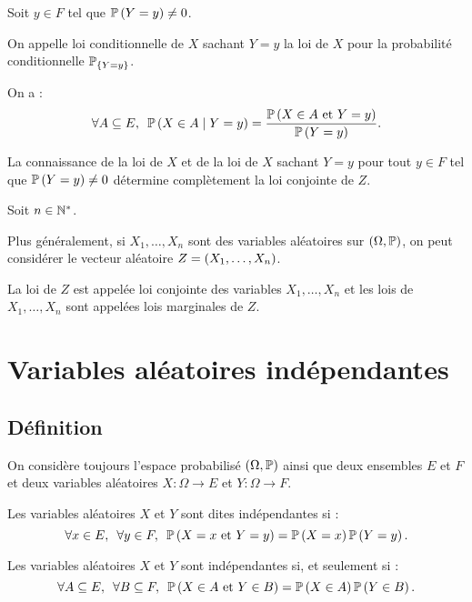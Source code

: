 \begin{defi}
Soit \(y\in F\) tel que \(\mathbb{P}\left(Y=y\right)\not=0\).

On appelle loi conditionnelle de \(X\) sachant \(Y=y\) la loi de \(X\) pour la probabilité conditionnelle \(\mathbb{P}_{\left\lbrace Y=y\right\rbrace}\).

On a : \[\quantifs{\forall A\subset E}\proba{X\in A\mid Y=y}=\dfrac{\proba{X\in A\text{ et }Y=y}}{\proba{Y=y}}.\]
\end{defi}

\begin{rem}
La connaissance de la loi de \(X\) et de la loi de \(X\) sachant \(Y=y\) pour tout \(y\in F\) tel que \(\mathbb{P}\left(Y=y\right)\not=0\) détermine complètement la loi conjointe de \(Z\).
\end{rem}

\begin{rem}
Soit \(n\in\mathbb{N}^*\).

Plus généralement, si \(X_1,\dots,X_n\) sont des variables aléatoires sur \(\groupe{\Omega}[\prem]\), on peut considérer le vecteur aléatoire \(Z=\left(X_1,\dots,X_n\right)\).

La loi de \(Z\) est appelée loi conjointe des variables \(X_1,\dots,X_n\) et les lois de \(X_1,\dots,X_n\) sont appelées lois marginales de \(Z\).
\end{rem}

\section{Variables aléatoires indépendantes}

\subsection{Définition}

On considère toujours l'espace probabilisé \(\groupe{\Omega}[\prem]\) ainsi que deux ensembles \(E\) et \(F\) et deux variables aléatoires \(X:\Omega\to E\) et \(Y:\Omega\to F\).

\begin{defi}
Les variables aléatoires \(X\) et \(Y\) sont dites indépendantes si : \[\quantifs{\forall x\in E;\forall y\in F}\proba{X=x\text{ et }Y=y}=\proba{X=x}\proba{Y=y}.\]
\end{defi}

\begin{prop}
Les variables aléatoires \(X\) et \(Y\) sont indépendantes si, et seulement si : \[\quantifs{\forall A\subset E;\forall B\subset F}\proba{X\in A\text{ et }Y\in B}=\proba{X\in A}\proba{Y\in B}.\]
\end{prop}

